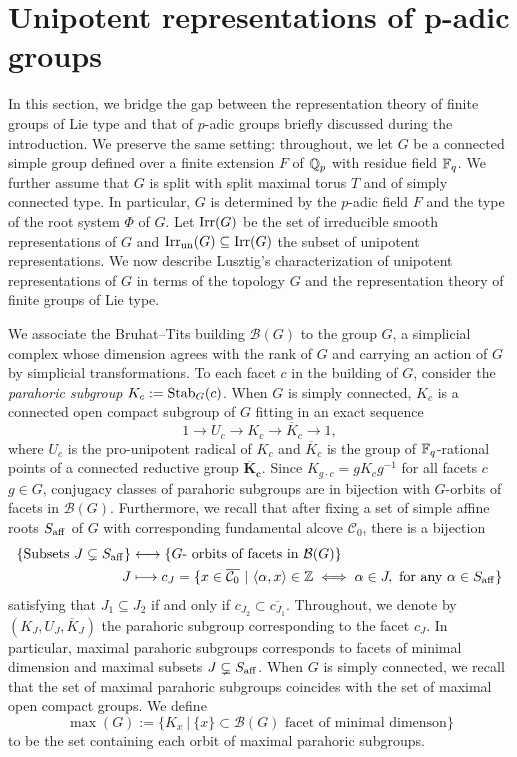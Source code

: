 \section{Unipotent representations of p-adic groups} \label{sec:padic_groups}
In this section, we bridge the gap between the representation theory of finite groups of Lie type and that of $p$-adic groups briefly discussed during the introduction. We preserve the same setting: throughout, we let $G$ be a connected simple group defined over a finite extension $F$ of $\mathbb{Q}_p$ with residue field $\mathbb{F}_q$. We further assume that $G$ is split with split maximal torus $T$ and of simply connected type. In particular, $G$ is determined by the $p$-adic field $F$ and the type of the root system $\Phi$ of $G$. Let $\mathrm{Irr}(G)$ be the set of irreducible smooth representations of $G$ and $\mathrm{Irr}_{\mathrm{un}}(G)\subseteq\mathrm{Irr}(G)$ the subset of unipotent representations. We now describe Lusztig's characterization of unipotent representations of $G$ in terms of the topology $G$ and the representation theory of finite groups of Lie type.

We associate the Bruhat--Tits building $\mathcal{B}(G)$ to the group $G$, a simplicial complex whose dimension agrees with the rank of $G$ and carrying an action of $G$ by simplicial transformations. To each facet $c$ in the building of $G$, consider the \textit{parahoric subgroup} $K_c:=\mathrm{Stab}_G(c)$. When $G$ is simply connected, $K_c$ is a connected open compact subgroup of $G$ fitting in an exact sequence
$$1\longrightarrow U_c\longrightarrow K_c\longrightarrow \overline{K}_c\longrightarrow 1,$$
where $U_c$ is the pro-unipotent radical of $K_c$ and $\overline{K}_c$ is the group of $\mathbb{F}_q$-rational points of a connected reductive group $\mathbf{\overline{K}_c}$. Since $K_{g\cdot c}=gK_cg^{-1}$ for all facets $c$ $g\in G$, conjugacy classes of parahoric subgroups are in bijection with $G$-orbits of facets in $\mathcal{B}(G)$. Furthermore, we recall that after fixing a set of simple affine roots $S_{\mathrm{aff}}$ of $G$ with corresponding fundamental alcove $\mathcal{C}_0$, there is a bijection
\begin{align*}
    \{\text{Subsets }J\subsetneq S_{\aff}\}&\longleftrightarrow\{G\text{- orbits of facets in }\mathcal{B}(G)\}\\
    J&\longmapsto c_J=\{x\in\overline{\mathcal{C}_0}\ |\ \langle\alpha,x\rangle\in\ZZ\iff\alpha\in J,\text{ for any }\alpha\in S_{\aff}\}
\end{align*}
satisfying that $J_1\subseteq J_2$ if and only if $c_{J_2}\subset \overline{c_{J_1}}$. Throughout, we denote by $(K_J,U_J,\overline{K}_J)$ the parahoric subgroup corresponding to the facet $c_J$. In particular, maximal parahoric subgroups corresponds to facets of minimal dimension and maximal subsets $J\subsetneq S_{\mathrm{aff}}$. When $G$ is simply connected, we recall that the set of maximal parahoric subgroups coincides with the set of maximal open compact groups. We define $$\max(G):=\{K_x\ |\ \{x\}\subset\mathcal{B}(G)\text{ facet of minimal dimenson}\}$$
to be the set containing each orbit of maximal parahoric subgroups.

